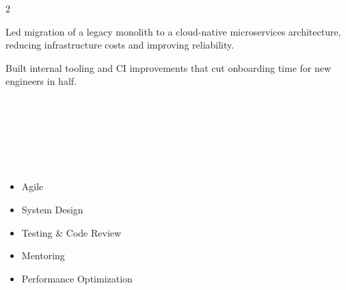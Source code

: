 \documentclass[10pt,a4paper,withhyper]{altacv}
\begin{document}
\begin{paracol}{2}

Led migration of a legacy monolith to a cloud-native microservices architecture, reducing infrastructure costs and improving reliability.

\divider

Built internal tooling and CI improvements that cut onboarding time for new engineers in half.

\switchcolumn


\\

\divider\smallskip

\\

\divider\smallskip

\\
\\

\medskip

\begin{itemize}
\item Agile
\item System Design
\item Testing \& Code Review
\item Mentoring
\item Performance Optimization
\end{itemize}



\end{paracol}
\end{document}
